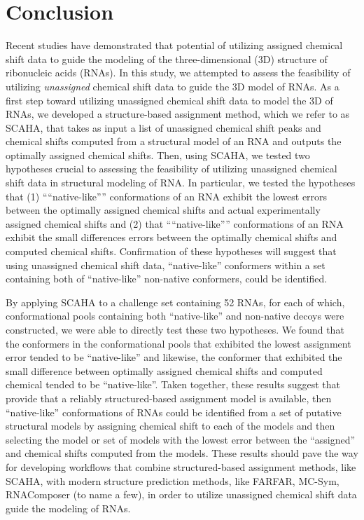 \documentclass[journal=jcisd8,manuscript=article,layout=onecolumn]{achemso}
\begin{document}
\section{Conclusion}
Recent studies have demonstrated that potential of utilizing assigned chemical shift data to guide the modeling of the three-dimensional (3D) structure of ribonucleic acids (RNAs). In this study, we attempted to assess the feasibility of utilizing \textit{unassigned} chemical shift data to guide the 3D model of RNAs. As a first step toward utilizing unassigned chemical shift data to model the 3D of RNAs, we developed a structure-based assignment method, which we refer to as SCAHA, that takes as input a list of unassigned chemical shift peaks and chemical shifts computed from a structural model of an RNA and outputs the optimally assigned chemical shifts. Then, using SCAHA, we tested two hypotheses crucial to assessing the feasibility of utilizing unassigned chemical shift data in structural modeling of RNA. In particular, we tested the hypotheses that (1) ````native-like''” conformations of an RNA exhibit the lowest errors between the optimally assigned chemical shifts and actual experimentally assigned chemical shifts and (2) that ````native-like''” conformations of an RNA exhibit the small differences errors between the optimally chemical shifts and computed chemical shifts. Confirmation of these hypotheses will suggest that using unassigned chemical shift data, ``native-like'' conformers within a set containing both of ``native-like'' non-native conformers, could be identified. 

By applying SCAHA to a challenge set containing 52 RNAs, for each of which, conformational pools containing both ``native-like'' and non-native decoys were constructed, we were able to directly test these two hypotheses. We found that the conformers in the conformational pools  that exhibited the lowest assignment error tended to be ``native-like'' and likewise, the conformer that exhibited the small difference between optimally assigned chemical shifts and computed chemical tended to be ``native-like''. Taken together, these results suggest that provide that a reliably structured-based assignment model is available, then ``native-like'' conformations of RNAs could be identified from a set of putative structural models by assigning chemical shift to each of the models and then selecting the model or set of models with the lowest error between the ``assigned'' and chemical shifts computed from the models. These results should pave the way for developing workflows that combine structured-based assignment methods, like SCAHA, with modern structure prediction methods, like FARFAR, MC-Sym, RNAComposer (to name a few), in order to utilize unassigned chemical shift data guide the modeling of RNAs.
\end{document}

